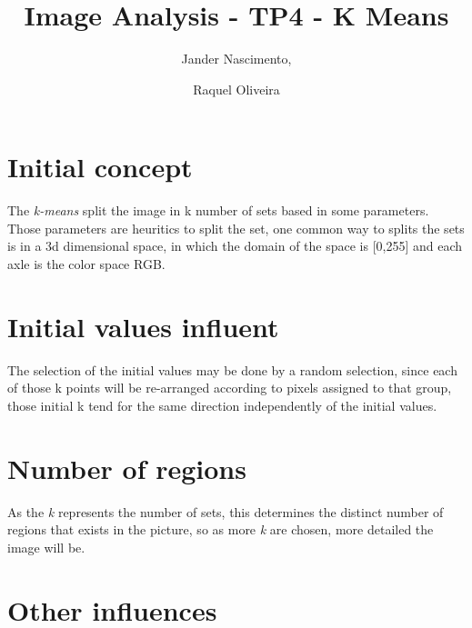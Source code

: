 \documentclass{article}
\begin{document}
\title{Image Analysis - TP4 - K Means}

\author{Jander Nascimento, 
\and Raquel Oliveira}

\maketitle

\section{Initial concept}

The \emph{k-means} split the image in k number of sets based in some parameters. Those parameters are heuritics to split the set, one common way to splits the sets is in a 3d dimensional space, in which the domain of the space is [0,255] and each axle is the color space RGB. 

\section{Initial values influent}

The selection of the initial values may be done by a random selection, since each of those k points will be re-arranged according to pixels assigned to that group, those initial k tend for the same direction independently of the initial values.

\section{Number of regions}

As the \emph{k} represents the number of sets, this determines the distinct number of regions that exists in the picture, so as more \emph{k} are chosen, more detailed the image will be.  

\section{Other influences}
\end{document}
